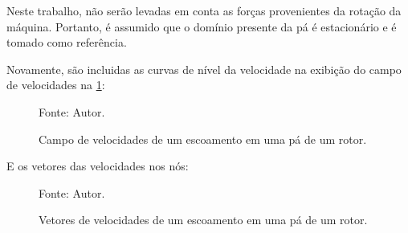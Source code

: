 Neste trabalho, não serão levadas em conta as forças provenientes da rotação da máquina.
Portanto, é assumido que o domínio presente da pá é estacionário e é tomado como referência.

Novamente, são incluidas as curvas de nível da velocidade na exibição do campo de velocidades na \ref{rotor_result}:
\begin{figure}[H]
    \centering
     {\raggedleft \scriptsize Fonte: Autor.}
    \caption{Campo de velocidades de um escoamento em uma pá de um rotor.}
    \label{rotor_result}
\end{figure}

E os vetores das velocidades nos nós:
\begin{figure}[H]
    \centering
     {\raggedleft \scriptsize Fonte: Autor.}
    \caption{Vetores de velocidades de um escoamento em uma pá de um rotor.}
    \label{rotor_velocity}
\end{figure}

